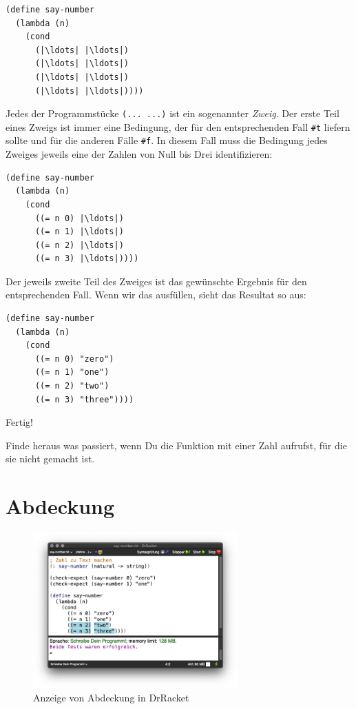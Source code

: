 \begin{lstlisting}
(define say-number
  (lambda (n)
    (cond
      (|\ldots| |\ldots|)
      (|\ldots| |\ldots|)
      (|\ldots| |\ldots|)
      (|\ldots| |\ldots|))))
\end{lstlisting}
%
Jedes der Programmstücke \lstinline{(... ...)} ist ein sogenannter
\textit{Zweig}.  Der erste Teil eines Zweigs ist immer
eine Bedingung, der für den entsprechenden Fall \lstinline{#t} liefern
sollte und für die anderen Fälle \lstinline{#f}.  In diesem Fall muss die
Bedingung jedes Zweiges jeweils eine der Zahlen von Null bis Drei
identifizieren:
%
\begin{lstlisting}
(define say-number
  (lambda (n)
    (cond
      ((= n 0) |\ldots|)
      ((= n 1) |\ldots|)
      ((= n 2) |\ldots|)
      ((= n 3) |\ldots|))))
\end{lstlisting}
%
Der jeweils zweite Teil des Zweiges ist das gewünschte Ergebnis für
den entsprechenden Fall.  Wenn wir das ausfüllen, sieht das Resultat
so aus:
%
\begin{lstlisting}
(define say-number
  (lambda (n)
    (cond
      ((= n 0) "zero")
      ((= n 1) "one")
      ((= n 2) "two")
      ((= n 3) "three"))))
\end{lstlisting}
%
Fertig!
\begin{aufgabeinline}
  Finde heraus was passiert, wenn Du die Funktion mit einer Zahl
  aufrufst, für die sie nicht gemacht ist.
\end{aufgabeinline}

\section{Abdeckung}
\label{sec:testabdeckung}

\begin{figure}[tb]
  \centering
  \includegraphics[width=0.7\textwidth]{i1verzw/coverage}
  \caption{Anzeige von Abdeckung in DrRacket}
  \label{fig:coverage}
\end{figure}

